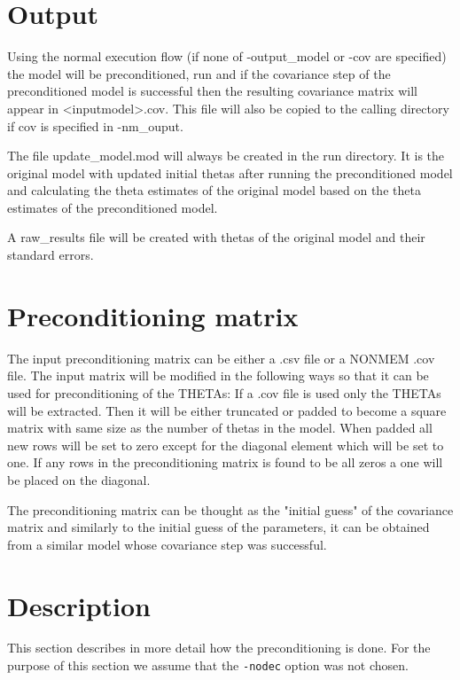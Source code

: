 \section{Output}

Using the normal execution flow (if none of -output\_model or -cov are specified) the model will be preconditioned, run and if the covariance step of the preconditioned model is successful then the resulting covariance matrix will appear in <inputmodel>.cov. This file will also be copied to the calling
directory if cov is specified in -nm\_ouput.

The file update\_model.mod will always be created in the run directory. It is the original model with updated initial thetas after
running the preconditioned model and calculating the theta estimates of the original model based on the theta estimates of the preconditioned model.

A raw\_results file will be created with thetas of the original model and their standard errors.

\section{Preconditioning matrix}

The input preconditioning matrix can be either a .csv file or a NONMEM .cov file. The input matrix will be modified in the following ways so that it can be used for preconditioning of the THETAs:
If a .cov file is used only the THETAs will be extracted.
Then it will be either truncated or padded to become a square matrix with same size as the number of thetas in the model.
When padded all new rows will be set to zero except for the diagonal element which will be set to one. If any rows in the preconditioning matrix is found
to be all zeros a one will be placed on the diagonal.

The preconditioning matrix can be thought as the "initial guess" of the covariance matrix and similarly to the initial guess of the parameters, it can be obtained from a similar model whose covariance step was successful.


\section{Description}

This section describes in more detail how the preconditioning is done. For the purpose of this section we assume that the \verb;-nodec; option was not chosen.

